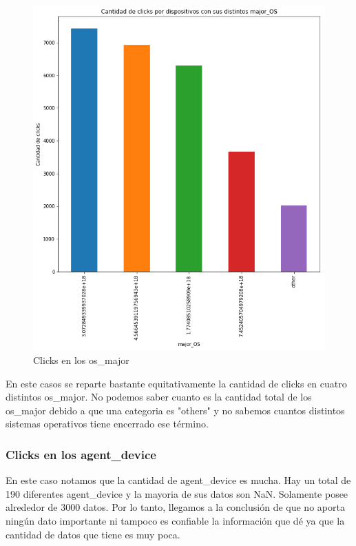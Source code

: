 \documentclass[a4paper, 12pt]{article}
\newcommand\tab[1][1cm]{\hspace*{#1}}
\begin{document}
		\FloatBarrier
		\begin{figure}[h]
			\centering
			\includegraphics[scale = 0.5]{images/clicks/clicks_major_OS.png}
			\caption{Clicks en los os\_major}
		\end{figure}
		\FloatBarrier

		\tab En este casos se reparte bastante equitativamente la cantidad de clicks en cuatro distintos os\_major. No podemos saber cuanto es la cantidad total de los os\_major debido a que una categoria es "others" y no sabemos cuantos distintos sistemas operativos tiene encerrado ese término.

	\subsubsection{Clicks en los agent\_device}
		\tab En este caso notamos que la cantidad de agent\_device es mucha. Hay un total de 190 diferentes agent\_device y la mayoria de sus datos son NaN. Solamente posee alrededor de 3000 datos. Por lo tanto, llegamos a la conclusión de que no aporta ningún dato importante ni tampoco es confiable la información que dé ya que la cantidad de datos que tiene es muy poca.
\end{document}
